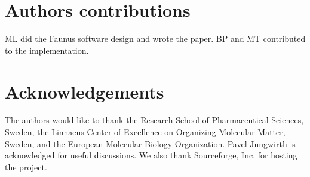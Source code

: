 \documentclass[10pt]{bmc_article}
\newenvironment{bmcformat}{\begin{raggedright}\baselineskip20pt\sloppy\setboolean{publ}{false}}{\end{raggedright}\baselineskip20pt\sloppy}
\begin{document}
\begin{bmcformat}
\section*{Authors contributions}
ML did the Faunus software design and wrote the paper.
BP and MT contributed to the implementation.

\section*{Acknowledgements}
  The authors would like to thank the Research School of Pharmaceutical Sciences, Sweden, the Linnaeus Center of Excellence on Organizing Molecular Matter, Sweden,
and the European Molecular Biology Organization.
Pavel Jungwirth is acknowledged for useful discussions.
We also thank Sourceforge, Inc. for hosting the project.


{
   }     %





\end{bmcformat}
\end{document}
